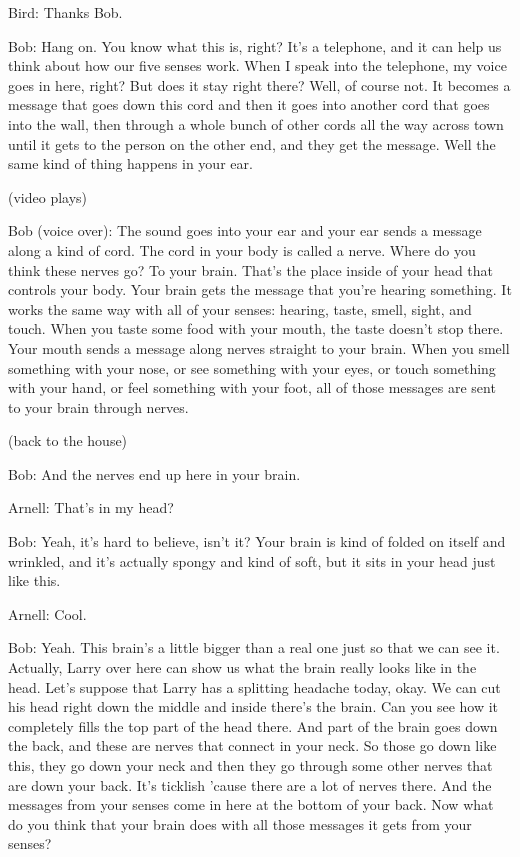Bird: Thanks Bob.

Bob: Hang on. You know what this is, right? It's a telephone, and it can help us think about how our five senses work. When I speak into the telephone, my voice goes in here, right? But does it stay right there? Well, of course not. It becomes a message that goes down this cord and then it goes into another cord that goes into the wall, then through a whole bunch of other cords all the way across town until it gets to the person on the other end, and they get the message. Well the same kind of thing happens in your ear.

(video plays)

Bob (voice over): The sound goes into your ear and your ear sends a message along a kind of cord. The cord in your body is called a nerve. Where do you think these nerves go? To your brain. That's the place inside of your head that controls your body. Your brain gets the message that you're hearing something. It works the same way with all of your senses: hearing, taste, smell, sight, and touch. When you taste some food with your mouth, the taste doesn't stop there. Your mouth sends a message along nerves straight to your brain. When you smell something with your nose, or see something with your eyes, or touch something with your hand, or feel something with your foot, all of those messages are sent to your brain through nerves.

(back to the house)

Bob: And the nerves end up here in your brain.

Arnell: That's in my head?

Bob: Yeah, it's hard to believe, isn't it? Your brain is kind of folded on itself and wrinkled, and it's actually spongy and kind of soft, but it sits in your head just like this.

Arnell: Cool.

Bob: Yeah. This brain's a little bigger than a real one just so that we can see it. Actually, Larry over here can show us what the brain really looks like in the head. Let's suppose that Larry has a splitting headache today, okay. We can cut his head right down the middle and inside there's the brain. Can you see how it completely fills the top part of the head there. And part of the brain goes down the back, and these are nerves that connect in your neck. So those go down like this, they go down your neck and then they go through some other nerves that are down your back. It's ticklish 'cause there are a lot of nerves there. And the messages from your senses come in here at the bottom of your back. Now what do you think that your brain does with all those messages it gets from your senses?

